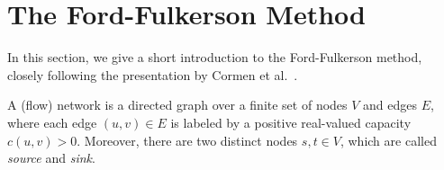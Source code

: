 \documentclass[smallcondensed]{svjour3}     %
\begin{document}
\section{The Ford-Fulkerson Method}\label{sec:background}
%       
%   
% 
%         
%   
%   
%   
%   
%   

In this section, we give a short introduction to the Ford-Fulkerson method, closely following the presentation by Cormen et al.~\cite{CLRS09}.

% 

A (flow) network is a directed graph over a finite set of nodes $V$ and edges $E$, where each edge $(u,v)\in E$ is labeled by a positive real-valued capacity $c(u,v)>0$.
Moreover, there are two distinct nodes $s,t\in V$, which are called \emph{source} and \emph{sink}. 
\end{document}
